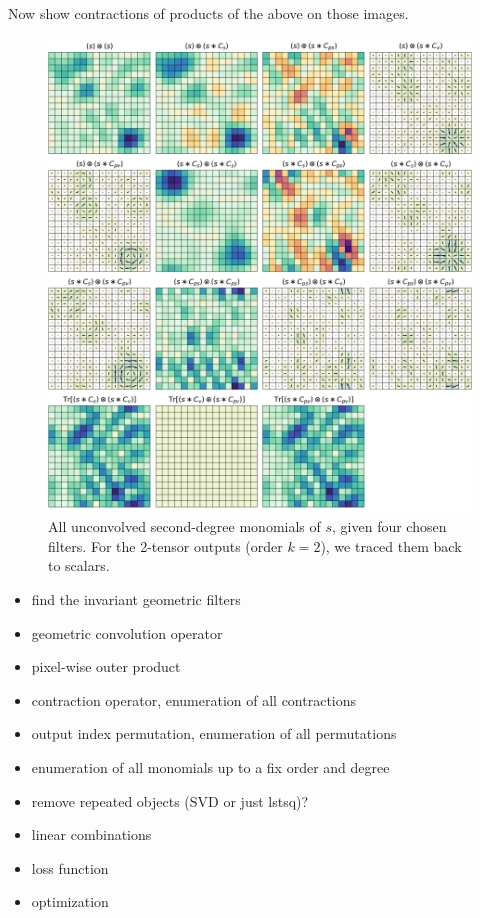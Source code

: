 \documentclass{article}
\newenvironment{hoggfigure}{%
  \begin{figure}[tp]%
    \begin{mdframed}%
    \color{captiongray}}{%
    \end{mdframed}%
  \end{figure}}
\theoremstyle{plain}
\begin{document}
Now show contractions of products of the above on those images.
\begin{hoggfigure}
  \begin{center}
    \includegraphics[width=\textwidth]{notebooks/monomials_2.png}
  \end{center}
  \caption{All unconvolved second-degree monomials of $s$, given four chosen filters. For the 2-tensor outputs (order $k=2$), we traced them back to scalars.}
\end{hoggfigure}

\begin{itemize}
    \item find the invariant geometric filters
    \item geometric convolution operator
    \item pixel-wise outer product
    \item contraction operator, enumeration of all contractions
    \item output index permutation, enumeration of all permutations
    \item enumeration of all monomials up to a fix order and degree 
    \item remove repeated objects (SVD or just lstsq)?
    \item linear combinations 
    \item loss function
    \item optimization
\end{itemize}
\end{document}
